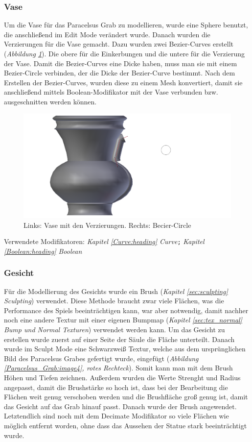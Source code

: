 \subsubsection{Vase}
Um die Vase für das Paracelsus Grab zu modellieren, wurde eine Sphere benutzt, die anschließend im Edit Mode verändert wurde. Danach wurden die Verzierungen für die Vase gemacht.
Dazu wurden zwei Bezier-Curves erstellt (\textit{Abbildung \ref{Paracelsus_Grab:image5}}). Die obere für die Einkerbungen und die untere für die Verzierung der Vase. Damit die Bezier-Curves eine
Dicke haben, muss man sie mit einem Bezier-Circle verbinden, der die Dicke der Bezier-Curve bestimmt.
Nach dem Erstellen der Bezier-Curves, wurden diese zu einem Mesh konvertiert, damit sie anschließend mittels Boolean-Modifikator mit der Vase verbunden
bzw. ausgeschnitten werden können.

\begin{figure}[H]
    \centering
    \includegraphics[width=.8\textwidth]{images/Paracelsus-Grab_Vase-Curve.png}
    \caption{Links: Vase mit den Verzierungen. Rechts: Becier-Circle}
    \label{Paracelsus_Grab:image5}
\end{figure}

Verwendete Modifikatoren: \textit{Kapitel \ref{Curve:heading} \dq Curve\dq}\verb+;+ \textit{Kapitel \ref{Boolean:heading} \dq Boolean\dq}

\subsubsection{Gesicht}
Für die Modellierung des Gesichts wurde ein Brush (\textit{Kapitel \ref{sec:sculpting} Sculpting}) verwendet. Diese Methode braucht zwar viele Flächen, was die Performance des Spiels beeinträchtigen kann, war
aber notwendig, damit nachher noch eine andere Textur mit einer eigenen Bumpmap (\textit{Kapitel \ref{sec:tex_normal} Bump und Normal Texturen}) verwendet werden kann. Um das Gesicht zu erstellen wurde zuerst auf einer Seite der Säule
die Fläche unterteilt. Danach wurde im Sculpt Mode eine Schwarzweiß Textur, welche aus dem ursprünglichen Bild des Paracelsus Grabes gefertigt wurde,
eingefügt (\textit{Abbildung \ref{Paracelsus_Grab:image4}, rotes Rechteck}).
Somit kann man mit dem Brush Höhen und Tiefen zeichnen. Außerdem wurden die Werte Strenght und Radius angepasst, damit die Brushstärke so hoch ist, dass bei der Bearbeitung die Flächen weit genug verschoben werden
und die Brushfläche groß genug ist, damit das Gesicht auf das Grab hinauf passt. Danach wurde der Brush angewendet. Letztendlich sind noch mit dem Decimate Modifikator so viele Flächen wie
möglich entfernt worden, ohne dass das Aussehen der Statue stark beeinträchtigt wurde.

